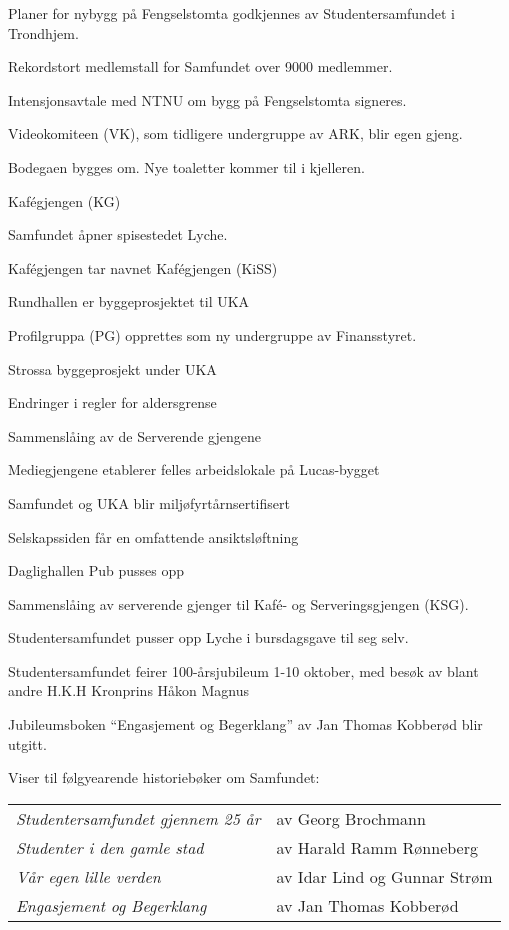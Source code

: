   \item Planer for nybygg på Fengselstomta godkjennes av Studentersamfundet i Trondhjem.
\yearend 

  \item Rekordstort medlemstall for Samfundet over 9000 medlemmer.
  \item Intensjonsavtale med NTNU om bygg på Fengselstomta signeres.
  \item Videokomiteen (VK), som tidligere undergruppe av ARK, blir egen gjeng.
  \item Bodegaen bygges om. Nye toaletter kommer til i kjelleren.
  \item Kafégjengen (KG)
\yearend 

  \item Samfundet åpner spisestedet Lyche.
  \item Kafégjengen tar navnet Kafégjengen (KiSS)
\yearend 

  \item Rundhallen er byggeprosjektet til UKA
  \item Profilgruppa (PG) opprettes som ny undergruppe av Finansstyret.
\yearend 

 \item Strossa byggeprosjekt under UKA
 \item Endringer i regler for aldersgrense
 \item Sammenslåing av de Serverende gjengene
 \item Mediegjengene etablerer felles arbeidslokale på Lucas-bygget
 \item Samfundet og UKA blir miljøfyrtårnsertifisert
 \item Selskapssiden får en omfattende ansiktsløftning
 \item Daglighallen Pub pusses opp
\yearend 

 \item Sammenslåing av serverende gjenger til Kaf\'e- og Serveringsgjengen (KSG).
 \item Studentersamfundet pusser opp Lyche i bursdagsgave til seg selv.
 \item Studentersamfundet feirer 100-årsjubileum 1-10 oktober, med besøk av blant andre H.K.H Kronprins Håkon 
 Magnus
 \item Jubileumsboken ``Engasjement og Begerklang'' av Jan Thomas Kobberød blir utgitt.
\yearend 

Viser til følgyearende historiebøker om Samfundet:

\begin{tabular}{ll}
    \emph{Studentersamfundet gjennem 25 år} & av Georg Brochmann\\
    \emph{Studenter i den gamle stad} &  av Harald Ramm Rønneberg\\
    \emph{Vår egen lille verden} &  av Idar Lind og Gunnar Strøm\\
    \emph{Engasjement og Begerklang} & av Jan Thomas Kobberød
\end{tabular}

